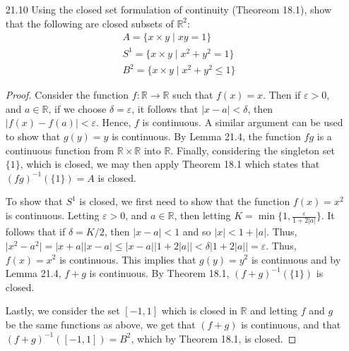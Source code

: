 \documentclass[12pt]{article}
\theoremstyle{definition}
\newcommand{\abs}[1]{\lvert #1 \rvert}
\begin{document}
\begin{enumerate}
\begin{enumerate}[label = (\alph*)]
            \end{enumerate}
        \item[21.10] Using the closed set formulation of continuity (Theoreom
            18.1), show that the following are closed subsets of
               $\mathbb{R}^2$:
               \begin{align*}
                   &A = \{x\times y\mid xy=1\} \\
                   &S^1 = \{x\times y\mid x^2+y^2=1\} \\
                   &B^2 = \{x\times y\mid x^2+y^2\leq 1\}
               \end{align*}
               \begin{proof}
                   Consider the function $f:\mathbb{R}\to\mathbb{R}$ such that
                   $f(x)=x$. Then if $\varepsilon>0$, and $a\in \mathbb{R}$, if
                   we choose $\delta=\varepsilon$, it follows that
                   $\abs{x-a}<\delta$, then $\abs{f(x)-f(a)}<\varepsilon$.
                   Hence, $f$ is continuous. A similar argument can be used to
                   show that $g(y)=y$ is continuous. By Lemma 21.4, the
                   function $fg$ is a continuous function from
                   $\mathbb{R}\times \mathbb{R}$ into $\mathbb{R}$. Finally,
                   considering the singleton set $\{1\}$, which is closed, we
                   may then apply Theorem 18.1 which states that
                   $(fg)^{-1}(\{1\})=A$ is closed.\par\hspace{4mm} To show that
                   $S^1$ is closed, we first need to show that the function
                   $f(x)=x^2$ is continuous. Letting $\varepsilon>0$, and
                   $a\in\mathbb{R}$, then letting $K=\min\{1,
                   \frac{\varepsilon}{1+2\abs{a}}\}$. It follows that if
                   $\delta= K/2$, then $\abs{x-a}<1$ and so
                   $\abs{x}<1+\abs{a}$. Thus,
                   $\abs{x^2-a^2}=\abs{x+a}\abs{x-a}\leq\abs{x-a}
                   \abs{1+2\abs{a}}<\delta\abs{1+2\abs{a}}=\varepsilon$. Thus,
                   $f(x)=x^2$ is continuous. This implies that $g(y)=y^2$ is
                   continuous and by Lemma 21.4, $f+g$ is continuous. By
                   Theorem 18.1, $(f+g)^{-1}(\{1\})$ is closed.\par\hspace{4mm}
                   Lastly, we consider the set $[-1, 1]$ which is closed in
                   $\mathbb{R}$ and letting $f$ and $g$ be the same functions
                   as above, we get that $(f+g)$ is continuous, and that
                   $(f+g)^{-1}([-1, 1])=B^2$, which by Theorem 18.1, is closed.
               \end{proof}
    \end{enumerate}
\end{document}
